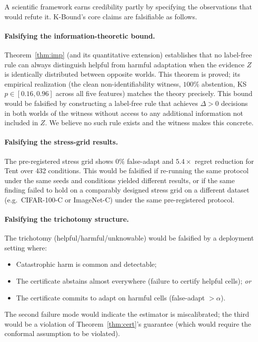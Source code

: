 A scientific framework earns credibility partly by specifying the observations that
would refute it.  K-Bound's core claims are falsifiable as follows.

\paragraph{Falsifying the information-theoretic bound.}
Theorem~\ref{thm:imp} (and its quantitative extension) establishes that no
label-free rule can always distinguish helpful from harmful adaptation when the
evidence $Z$ is identically distributed between opposite worlds.  This theorem is
proved; its empirical realization (the clean non-identifiability witness,
$100\%$ abstention, KS $p \in [0.16, 0.96]$ across all five features) matches the
theory precisely.  This bound would be falsified by constructing a label-free rule
that achieves $\Delta > 0$ decisions in both worlds of the witness without access to
any additional information not included in $Z$.  We believe no such rule exists and
the witness makes this concrete.

\paragraph{Falsifying the stress-grid results.}
The pre-registered stress grid shows $0\%$ false-adapt and $5.4{\times}$ regret
reduction for Tent over 432 conditions.  This would be falsified if re-running the
same protocol under the same seeds and conditions yielded different results, or if the
same finding failed to hold on a comparably designed stress grid on a different dataset
(e.g.\ CIFAR-100-C or ImageNet-C) under the same pre-registered protocol.

\paragraph{Falsifying the trichotomy structure.}
The trichotomy (helpful/harmful/unknowable) would be falsified by a deployment
setting where:
\begin{itemize}
\item Catastrophic harm is common and detectable;
\item The certificate abstains almost everywhere (failure to certify helpful cells);
  \emph{or}
\item The certificate commits to adapt on harmful cells (false-adapt $> \alpha$).
\end{itemize}
The second failure mode would indicate the estimator is miscalibrated; the third
would be a violation of Theorem~\ref{thm:cert}'s guarantee (which would require the
conformal assumption to be violated).

